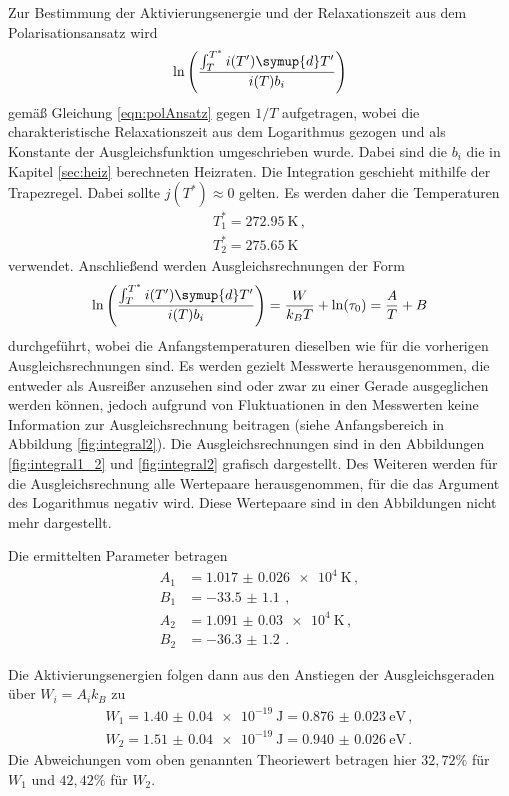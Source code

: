 Zur Bestimmung der Aktivierungsenergie und der Relaxationszeit aus dem Polarisationsansatz wird
\begin{equation*}
	\ln\left(\frac{\int_T^{T^*}i(T') \symup{d}T'}{i(T) b_i}\right)
\end{equation*}
gemäß Gleichung \eqref{eqn:polAnsatz} gegen $1/T$ aufgetragen, wobei die charakteristische Relaxationszeit aus dem Logarithmus gezogen und als Konstante der Ausgleichsfunktion umgeschrieben wurde. Dabei sind die $b_i$ die in Kapitel \ref{sec:heiz}
berechneten Heizraten. Die Integration geschieht mithilfe der Trapezregel. Dabei sollte $j(T^*)\approx 0$ gelten. Es werden daher die Temperaturen
\begin{align*}
	T_1^*=\SI{272.95}{\kelvin} \,, \\
	T_2^*=\SI{275.65}{\kelvin}
\end{align*}
verwendet.
Anschließend werden Ausgleichsrechnungen der Form
\begin{equation*}
	\ln\left(\frac{\int_T^{T^*}i(T') \symup{d}T'}{i(T) b_i}\right) =\frac{W}{k_B T}+\ln(\tau_0)=\frac{A}{T}+B
\end{equation*}
durchgeführt, wobei die Anfangstemperaturen dieselben wie für die vorherigen Ausgleichsrechnungen sind. Es werden gezielt Messwerte herausgenommen, die entweder als Ausreißer anzusehen sind oder zwar zu einer Gerade ausgeglichen werden können, jedoch aufgrund von Fluktuationen in den Messwerten keine Information zur Ausgleichsrechnung beitragen (siehe Anfangsbereich in Abbildung \ref{fig:integral2}). Die Ausgleichsrechnungen sind in den
Abbildungen \ref{fig:integral1_2} und \ref{fig:integral2} grafisch dargestellt.
Des Weiteren werden für die Ausgleichsrechnung alle Wertepaare herausgenommen, für die das Argument des Logarithmus negativ wird. Diese Wertepaare sind in den Abbildungen nicht mehr dargestellt.

Die ermittelten Parameter betragen
\begin{align*}
  A_1&=\SI{1.017(26)e+4}{\kelvin} \,, \\
  B_1&=\SI{-33.5(11)}{}  \,, \\
  A_2&=\SI{1.091(30)e+4}{\kelvin} \,, \\
  B_2&=\SI{-36.3(12)}{}  \,.
\end{align*}

Die Aktivierungsenergien folgen dann aus den Anstiegen der
Ausgleichsgeraden über $W_i=A_i k_B$ zu
\begin{align*}
	W_1=\SI{1.40(4)e-19}{\joule}=\SI{0.876(23)}{\eV} \,, \\
	W_2=\SI{1.51(4)e-19}{\joule}=\SI{0.940(26)}{\eV} \,.
\end{align*}
Die Abweichungen vom oben genannten Theoriewert betragen hier
$32{,}72\%$ für $W_1$ und $42{,}42\%$ für $W_2$.

